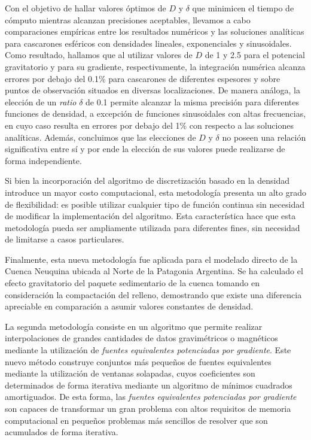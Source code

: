 Con el objetivo de hallar valores óptimos de $D$ y $\delta$ que minimicen el
tiempo de cómputo mientras alcanzan precisiones aceptables, llevamos a cabo
comparaciones empíricas entre los resultados numéricos y las soluciones
analíticas para cascarones esféricos con densidades lineales, exponenciales
y sinusoidales.
Como resultado, hallamos que al utilizar valores de $D$ de 1 y 2.5 para el
potencial gravitatorio y para su gradiente, respectivamente, la integración
numérica alcanza errores por debajo del 0.1\% para cascarones de diferentes
espesores y sobre puntos de observación situados en diversas localizaciones.
De manera análoga, la elección de un \emph{ratio} $\delta$ de 0.1 permite
alcanzar la misma precisión para diferentes funciones de densidad, a excepción
de funciones sinusoidales con altas frecuencias, en cuyo caso resulta en
errores por debajo del 1\% con respecto a las soluciones analíticas.
Además, concluimos que las elecciones de $D$ y $\delta$ no poseen una relación
significativa entre sí y por ende la elección de sus valores puede realizarse
de forma independiente.

Si bien la incorporación del algoritmo de discretización basado en la densidad
introduce un mayor costo computacional, esta metodología presenta un alto grado
de flexibilidad: es posible utilizar cualquier tipo de función continua sin
necesidad de modificar la implementación del algoritmo.
Esta característica hace que esta metodología pueda ser ampliamente utilizada
para diferentes fines, sin necesidad de limitarse a casos particulares.

Finalmente, esta nueva metodología fue aplicada para el modelado directo de la
Cuenca Neuquina ubicada al Norte de la Patagonia Argentina.
Se ha calculado el efecto gravitatorio del paquete sedimentario de la cuenca
tomando en consideración la compactación del relleno, demostrando que existe
una diferencia apreciable en comparación a asumir valores constantes de
densidad.

\vspace{1em}

La segunda metodología consiste en un algoritmo que permite realizar
interpolaciones de grandes cantidades de datos gravimétricos o magnéticos
mediante la utilización de \emph{fuentes equivalentes potenciadas por
gradiente}.
Este nuevo método construye conjuntos más pequeños de fuentes equivalentes
mediante la utilización de ventanas solapadas, cuyos coeficientes son
determinados de forma iterativa mediante un algoritmo de mínimos cuadrados
amortiguados.
De esta forma, las \emph{fuentes equivalentes potenciadas por gradiente} son
capaces de transformar un gran problema con altos requisitos de memoria
computacional en pequeños problemas más sencillos de resolver que son
acumulados de forma iterativa.

